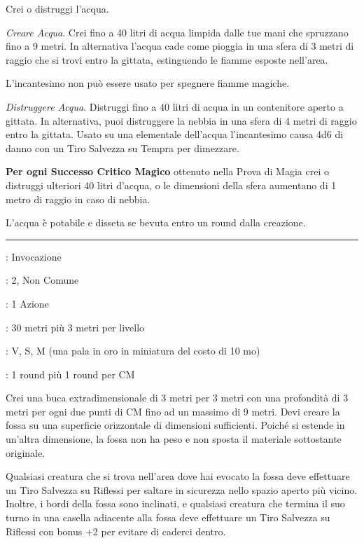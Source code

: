 \begin{multicols}{2}
Crei o distruggi l'acqua.

\emph{Creare Acqua}. Crei fino a 40 litri di acqua limpida dalle tue mani che spruzzano fino a 9 metri. In alternativa l'acqua cade come pioggia in una sfera di 3 metri di raggio che si trovi entro la gittata, estinguendo le fiamme esposte nell'area.

L'incantesimo non può essere usato per spegnere fiamme magiche.

\emph{Distruggere Acqua}. Distruggi fino a 40 litri di acqua in un contenitore aperto a gittata. In alternativa, puoi distruggere la nebbia in una sfera di 4 metri di raggio entro la gittata. Usato su una elementale dell'acqua l'incantesimo causa 4d6 di danno con un Tiro Salvezza su Tempra per dimezzare.

\textbf{Per ogni Successo Critico Magico} ottenuto nella Prova di Magia crei o distruggi ulteriori 40 litri d'acqua, o le dimensioni della sfera aumentano di 1 metro di raggio in caso di nebbia.

L'acqua è potabile e disseta se bevuta entro un round dalla creazione.

\smallskip\noindent\rule{\linewidth}{2pt} \hypertarget{Creare Fossa}{}\smallskip{}
\noindent
\begin{description}[noitemsep, topsep=0pt, parsep=0pt, partopsep=0pt, leftmargin=0cm, labelwidth=2.8cm]
	\item[\textbf{Lista di Magia}]: Invocazione
	\item[\textbf{Livello}]: 2, Non Comune
	\item[\textbf{T. di Lancio}]: 1 Azione
	\item[\textbf{Gittata}]: 30 metri più 3 metri per livello
	\item[\textbf{Componenti}]: V, S, M (una pala in oro in miniatura del costo di 10 mo)
	\item[\textbf{Durata}]: 1 round più 1 round per CM
\end{description}

Crei una buca extradimensionale di 3 metri per 3 metri con una profondità di 3 metri per ogni due punti di CM fino ad un massimo di 9 metri. Devi creare la fossa su una superficie orizzontale di dimensioni sufficienti. Poiché si estende in un'altra dimensione, la fossa non ha peso e non sposta il materiale sottostante originale.

Qualsiasi creatura che si trova nell'area dove hai evocato la fossa deve effettuare un Tiro Salvezza su Riflessi per saltare in sicurezza nello spazio aperto più vicino. Inoltre, i bordi della fossa sono inclinati, e qualsiasi creatura che termina il suo turno in una casella adiacente alla fossa deve effettuare un Tiro Salvezza su Riflessi con bonus +2 per evitare di caderci dentro.


\end{multicols}
